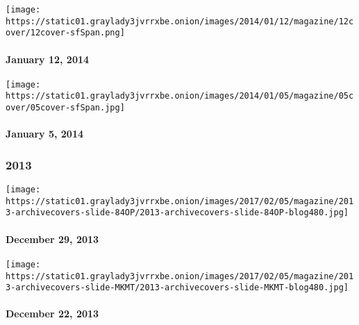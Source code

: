\href{http://www.nytimes3xbfgragh.onion/indexes/2014/01/12/magazine/index.html}{}

\texttt{[image: https://static01.graylady3jvrrxbe.onion/images/2014/01/12/magazine/12cover/12cover-sfSpan.png]}

\hypertarget{january-12-2014}{%
\paragraph{January 12, 2014}\label{january-12-2014}}

\href{http://www.nytimes3xbfgragh.onion/indexes/2014/01/06/magazine/index.html}{}

\texttt{[image: https://static01.graylady3jvrrxbe.onion/images/2014/01/05/magazine/05cover/05cover-sfSpan.jpg]}

\hypertarget{january-5-2014}{%
\paragraph{January 5, 2014}\label{january-5-2014}}

\hypertarget{2013}{%
\subsubsection{2013}\label{2013}}

\href{http://www.nytimes3xbfgragh.onion/indexes/2013/12/29/magazine/index.html}{}

\texttt{[image: https://static01.graylady3jvrrxbe.onion/images/2017/02/05/magazine/2013-archivecovers-slide-84OP/2013-archivecovers-slide-84OP-blog480.jpg]}

\hypertarget{december-29-2013}{%
\paragraph{December 29, 2013}\label{december-29-2013}}

\href{http://www.nytimes3xbfgragh.onion/indexes/2013/12/22/magazine/index.html}{}

\texttt{[image: https://static01.graylady3jvrrxbe.onion/images/2017/02/05/magazine/2013-archivecovers-slide-MKMT/2013-archivecovers-slide-MKMT-blog480.jpg]}

\hypertarget{december-22-2013}{%
\paragraph{December 22, 2013}\label{december-22-2013}}

\href{http://www.nytimes3xbfgragh.onion/indexes/2013/12/15/magazine/index.html}{}

